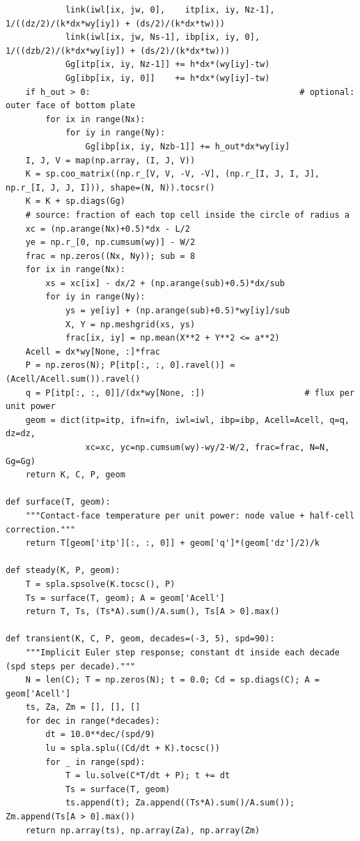 \documentclass[11pt,a4paper]{article}
\begin{document}
\begin{lstlisting}
            link(iwl[ix, jw, 0],    itp[ix, iy, Nz-1], 1/((dz/2)/(k*dx*wy[iy]) + (ds/2)/(k*dx*tw)))
            link(iwl[ix, jw, Ns-1], ibp[ix, iy, 0],    1/((dzb/2)/(k*dx*wy[iy]) + (ds/2)/(k*dx*tw)))
            Gg[itp[ix, iy, Nz-1]] += h*dx*(wy[iy]-tw)
            Gg[ibp[ix, iy, 0]]    += h*dx*(wy[iy]-tw)
    if h_out > 0:                                          # optional: outer face of bottom plate
        for ix in range(Nx):
            for iy in range(Ny):
                Gg[ibp[ix, iy, Nzb-1]] += h_out*dx*wy[iy]
    I, J, V = map(np.array, (I, J, V))
    K = sp.coo_matrix((np.r_[V, V, -V, -V], (np.r_[I, J, I, J], np.r_[I, J, J, I])), shape=(N, N)).tocsr()
    K = K + sp.diags(Gg)
    # source: fraction of each top cell inside the circle of radius a
    xc = (np.arange(Nx)+0.5)*dx - L/2
    ye = np.r_[0, np.cumsum(wy)] - W/2
    frac = np.zeros((Nx, Ny)); sub = 8
    for ix in range(Nx):
        xs = xc[ix] - dx/2 + (np.arange(sub)+0.5)*dx/sub
        for iy in range(Ny):
            ys = ye[iy] + (np.arange(sub)+0.5)*wy[iy]/sub
            X, Y = np.meshgrid(xs, ys)
            frac[ix, iy] = np.mean(X**2 + Y**2 <= a**2)
    Acell = dx*wy[None, :]*frac
    P = np.zeros(N); P[itp[:, :, 0].ravel()] = (Acell/Acell.sum()).ravel()
    q = P[itp[:, :, 0]]/(dx*wy[None, :])                    # flux per unit power
    geom = dict(itp=itp, ifn=ifn, iwl=iwl, ibp=ibp, Acell=Acell, q=q, dz=dz,
                xc=xc, yc=np.cumsum(wy)-wy/2-W/2, frac=frac, N=N, Gg=Gg)
    return K, C, P, geom

def surface(T, geom):
    """Contact-face temperature per unit power: node value + half-cell correction."""
    return T[geom['itp'][:, :, 0]] + geom['q']*(geom['dz']/2)/k

def steady(K, P, geom):
    T = spla.spsolve(K.tocsc(), P)
    Ts = surface(T, geom); A = geom['Acell']
    return T, Ts, (Ts*A).sum()/A.sum(), Ts[A > 0].max()

def transient(K, C, P, geom, decades=(-3, 5), spd=90):
    """Implicit Euler step response; constant dt inside each decade (spd steps per decade)."""
    N = len(C); T = np.zeros(N); t = 0.0; Cd = sp.diags(C); A = geom['Acell']
    ts, Za, Zm = [], [], []
    for dec in range(*decades):
        dt = 10.0**dec/(spd/9)
        lu = spla.splu((Cd/dt + K).tocsc())
        for _ in range(spd):
            T = lu.solve(C*T/dt + P); t += dt
            Ts = surface(T, geom)
            ts.append(t); Za.append((Ts*A).sum()/A.sum()); Zm.append(Ts[A > 0].max())
    return np.array(ts), np.array(Za), np.array(Zm)


\end{lstlisting}
\end{document}
